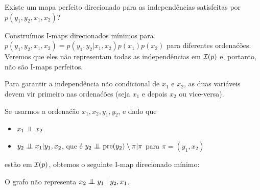 \begin{exenumerate}
\begin{solution}
\end{solution}
\item Existe um mapa perfeito direcionado para as independ\^encias satisfeitas por $p(y_1,y_2,x_1,x_2)$?

\begin{solution} Constru\'imos I-maps direcionados m\'inimos para $p(y_1,y_2,x_1,x_2) = p(y_1, y_2 | x_1, x_2)p(x_1) p(x_2)$ para diferentes ordena\'c\~oes. Veremos que eles n\~ao representam todas as independ\^encias em $\mathcal{I}(p)$ e, portanto, n\~ao s\~ao I-maps perfeitos.
    
    Para garantir a independ\^encia n\~ao condicional de $x_1$ e $x_2$, as duas vari\'aveis devem vir primeiro nas ordena\'c\~oes (seja $x_1$ e depois $x_2$ ou vice-versa).
    
    Se usarmos a ordena\'c\~ao $x_1,x_2,y_1,y_2$, e dado que 
    \begin{itemize}
        \item $x_1 \mathrel{\perp\mspace{-10mu}\perp} x_2$
        \item $y_2 \mathrel{\perp\mspace{-10mu}\perp} x_1 | y_1, x_2$, que \'e $y_2 \mathrel{\perp\mspace{-10mu}\perp} \mathrm{pre}(y_2) \setminus \pi | \pi$ para $\pi = (y_1, x_2)$
    \end{itemize}
    est\~ao em $\mathcal{I}(p)$, obtemos o seguinte I-map direcionado m\'inimo:
    \begin{center}
    \end{center}
    O grafo n\~ao representa $x_2 \mathrel{\perp\mspace{-10mu}\perp} y_1 \mid y_2, x_1$.
    

\end{solution}
\end{exenumerate}
